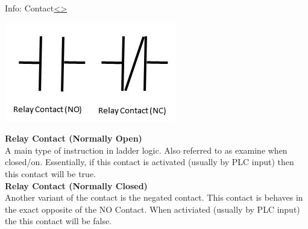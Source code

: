 \documentclass[12pt]{extarticle}
\newenvironment{instructionblock}{\Large\bgroup}{\egroup}
\newcounter{next}
\newcounter{prev}
\begin{document}
\pagebreak
{}
\begin{slide}{Info: Contact}{\hyperref[slide \theprev]{\textless}\hyperref[slide \thenext]{\textgreater}}
\begin{instructionblock}
	\begin{center}
		\includegraphics[scale=1.8]{Images/LadderDiagram02.JPG}
	\end{center}
\end{instructionblock}
\end{slide}
\vfill
\noindent
\textbf{Relay Contact (Normally Open)}\\
A main type of instruction in ladder logic. Also referred to as examine when closed/on. Essentially, if this contact is activated (usually by PLC input) then this contact will be true. \cite{OP_plcs} \\
\textbf{Relay Contact (Normally Closed)}\\
Another variant of the contact is the negated contact. This contact is behaves in the exact opposite of the NO Contact. When activiated (usually by PLC input) the this contact will be false. \cite{OP_plcs}

\end{document}
